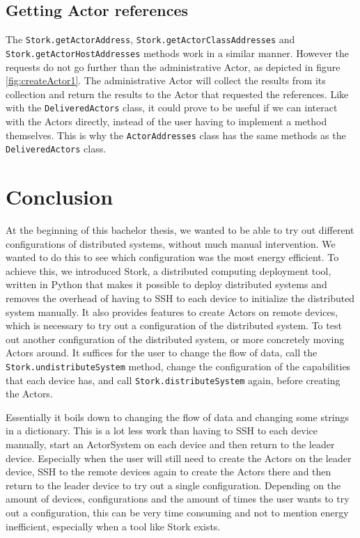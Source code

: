 \documentclass[a4paper]{article}
\begin{document}
\subsection{Getting Actor references}
The \lstinline|Stork.getActorAddress|, \lstinline|Stork.getActorClassAddresses| and \lstinline|Stork.getActorHostAddresses| methods work in a similar manner. However the requests do not go further than the administrative Actor, as depicted in figure \ref{fig:createActor1}. The administrative Actor will collect the results from its collection and return the results to the Actor that requested the references. Like with the \lstinline{DeliveredActors} class, it could prove to be useful if we can interact with the Actors directly, instead of the user having to implement a method themselves. This is why the \lstinline{ActorAddresses} class has the same methods as the \lstinline{DeliveredActors} class.
\section{Conclusion}
At the beginning of this bachelor thesis, we wanted to be able to try out different configurations of distributed systems, without much manual intervention. We wanted to do this to see which configuration was the most energy efficient. To achieve this, we introduced Stork, a distributed computing deployment tool, written in Python that makes it possible to deploy distributed systems and removes the overhead of having to SSH to each device to initialize the distributed system manually. It also provides features to create Actors on remote devices, which is necessary to try out a configuration of the distributed system. To test out another configuration of the distributed system, or more concretely moving Actors around. It suffices for the user to change the flow of data, call the \lstinline|Stork.undistributeSystem| method, change the configuration of the capabilities that each device has, and call \lstinline|Stork.distributeSystem| again, before creating the Actors.

Essentially it boils down to changing the flow of data and changing some strings in a dictionary. This is a lot less work than having to SSH to each device manually, start an ActorSystem on each device and then return to the leader device. Especially when the user will still need to create the Actors on the leader device, SSH to the remote devices again to create the Actors there and then return to the leader device to try out a single configuration. Depending on the amount of devices, configurations and the amount of times the user wants to try out a configuration, this can be very time consuming and not to mention energy inefficient, especially when a tool like Stork exists.
\printbibliography
\end{document}
